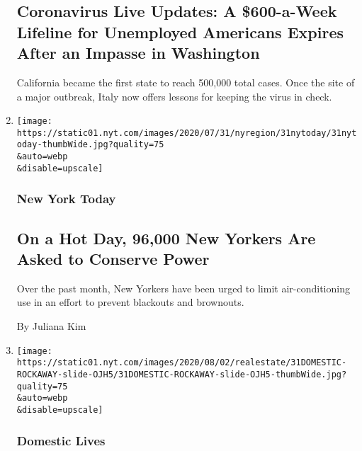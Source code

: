 \begin{enumerate}
  \hypertarget{coronavirus-live-updates-a-600-a-week-lifeline-for-unemployed-americans-expires-after-an-impasse-in-washington}{%
  \subsection{Coronavirus Live Updates: A \$600-a-Week Lifeline for
  Unemployed Americans Expires After an Impasse in
  Washington}\label{coronavirus-live-updates-a-600-a-week-lifeline-for-unemployed-americans-expires-after-an-impasse-in-washington}}

  California became the first state to reach 500,000 total cases. Once
  the site of a major outbreak, Italy now offers lessons for keeping the
  virus in check.
\item
  \href{/2020/07/31/nyregion/nyc-power-con-edison.html}{}

  \texttt{[image: https://static01.nyt.com/images/2020/07/31/nyregion/31nytoday/31nytoday-thumbWide.jpg?quality=75\\\&auto=webp\\\&disable=upscale]}

  \hypertarget{new-york-today}{%
  \subsubsection{New York Today}\label{new-york-today}}

  \hypertarget{on-a-hot-day-96000-new-yorkers-are-asked-to-conserve-power}{%
  \subsection{On a Hot Day, 96,000 New Yorkers Are Asked to Conserve
  Power}\label{on-a-hot-day-96000-new-yorkers-are-asked-to-conserve-power}}

  Over the past month, New Yorkers have been urged to limit
  air-conditioning use in an effort to prevent blackouts and brownouts.~

  By Juliana Kim
\item
  \href{/2020/07/31/realestate/a-rockaway-beach-queens-life.html}{}

  \texttt{[image: https://static01.nyt.com/images/2020/08/02/realestate/31DOMESTIC-ROCKAWAY-slide-OJH5/31DOMESTIC-ROCKAWAY-slide-OJH5-thumbWide.jpg?quality=75\\\&auto=webp\\\&disable=upscale]}

  \hypertarget{domestic-lives}{%
  \subsubsection{Domestic Lives}\label{domestic-lives}}


\end{enumerate}
